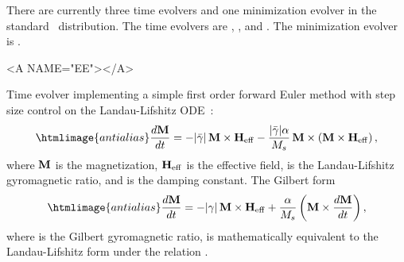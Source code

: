 There are currently three time evolvers and one minimization evolver in the
standard \OOMMF\ distribution.  The time evolvers are
,
, and
.
The minimization evolver is
.
\begin{description}
\begin{rawhtml}<A NAME="EE"></A>\end{rawhtml}%
%
\item[Oxs\_EulerEvolve:\label{html:EulerEvolve}]
Time evolver implementing a simple first order forward Euler method with
step size control on the Landau-Lifshitz
ODE~\cite{gilbert55,landau35}:\\
\begin{equation}
\htmlimage{antialias}
  \frac{d\vM}{dt} = -|\bar{\gamma}|\,\vM\times\vH_{\rm eff}
   - \frac{|\bar{\gamma}|\alpha}{M_s}\,
     \vM\times\left(\vM\times\vH_{\rm eff}\right),
\label{eq:oxsllode}
\end{equation}
where $\textbf{M}$ is the magnetization, $\textbf{H}_{\rm eff}$ is the effective
field, \abovemath{\bar{\gamma}} is the Landau-Lifshitz gyromagnetic ratio, and
\abovemath{\alpha} is the damping constant. The Gilbert form
\begin{equation}
\htmlimage{antialias}
  \frac{d\vM}{dt} = -|\gamma|\,\vM\times\vH_{\rm eff}
   + \frac{\alpha}{M_s}
     \left(\vM\times\frac{d\vM}{dt}\right),
\label{eq:oxsllgode}
\end{equation}
where \abovemath{\gamma} is the Gilbert gyromagnetic ratio, is
mathematically equivalent to the Landau-Lifshitz form under the
relation .


\end{description}
